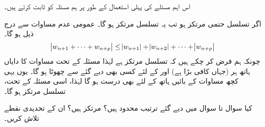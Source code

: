 اس اہم مسئلے کی پہلی استعمال کے طور پر ہم مسئلہ  کو ثابت کرتے ہیں۔

\quad
اگر تسلسل  حتمی مرتکز ہو تب یہ تسلسل مرتکز ہو گا۔
\quad
عمومی عدم مساوات  سے درج ذیل ہو گا۔
\begin{align}\label{مساوات_ترتیب_حتمی_مرتکز_اور_مرتکز_الف}
\abs{w_{n+1}+\cdots+w_{n+p}}\le \abs{w_{n+1}}+\abs{w_{n+2}}+\cdots+\abs{w_{n+p}}
\end{align}
چونکہ ہم فرض کر چکے ہیں کہ تسلسل  مرتکز ہے  لہٰذا مسئلہ  کے تحت  مساوات  کا دایاں ہاتھ   ہر  (جہاں  کافی بڑا ہے) اور  کے لئے کسی بھی دیے گئے  سے چھوٹا ہو گا۔ یوں یہی کچھ مساوات  کے بائیں ہاتھ کے لئے بھی درست ہو گا لہٰذا، اسی مسئلہ کے تحت، تسلسل  مرتکز ہو گا۔

 کیا سوال  تا سوال  میں دیے گئے  ترتیب  محدود ہیں؟ مرتکز ہیں؟ ان کے تحدیدی نقطے تلاش کریں۔ 

